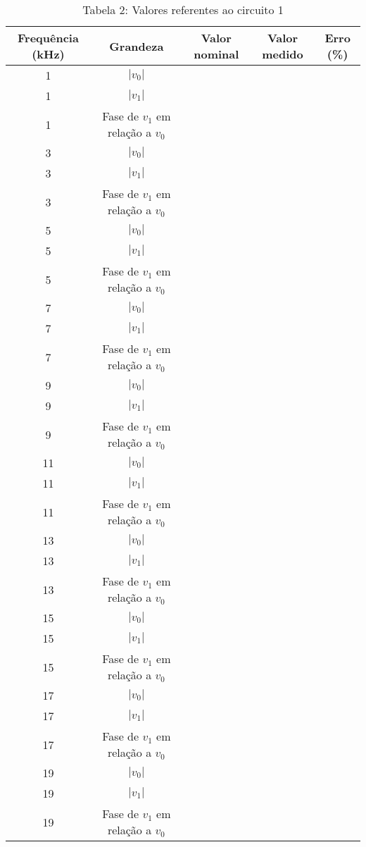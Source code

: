 \vspace{5pt}
\begin{table}[h]
\centering
\begin{tabular}{|c|c|c|c|c|}
\hline
\textbf{Frequência (kHz)} & \textbf{Grandeza} & \textbf{Valor nominal} & \textbf{Valor medido} & 
\textbf{Erro (\%) }\\\hline
1  & $|v_0|$ &  &  &  \\\hline
1  & $|v_1|$ &  &  &  \\\hline
1  & Fase de $v_1$ em relação a $v_0$ &  &  &  \\\hline
3  & $|v_0|$ &  &  &  \\\hline
3  & $|v_1|$ &  &  &  \\\hline
3  & Fase de $v_1$ em relação a $v_0$ &  &  &  \\\hline
5  & $|v_0|$ &  &  &  \\\hline
5  & $|v_1|$ &  &  &  \\\hline
5  & Fase de $v_1$ em relação a $v_0$ &  &  &  \\\hline
7  & $|v_0|$ &  &  &  \\\hline
7  & $|v_1|$ &  &  &  \\\hline
7  & Fase de $v_1$ em relação a $v_0$ &  &  &  \\\hline
9  & $|v_0|$ &  &  &  \\\hline
9  & $|v_1|$ &  &  &  \\\hline
9  & Fase de $v_1$ em relação a $v_0$ &  &  &  \\\hline
11 & $|v_0|$ &  &  &  \\\hline
11 & $|v_1|$ &  &  &  \\\hline
11 & Fase de $v_1$ em relação a $v_0$ &  &  &  \\\hline
13 & $|v_0|$ &  &  &  \\\hline
13 & $|v_1|$ &  &  &  \\\hline
13 & Fase de $v_1$ em relação a $v_0$ &  &  &  \\\hline
15 & $|v_0|$ &  &  &  \\\hline
15 & $|v_1|$ &  &  &  \\\hline
15 & Fase de $v_1$ em relação a $v_0$ &  &  &  \\\hline
17 & $|v_0|$ &  &  &  \\\hline
17 & $|v_1|$ &  &  &  \\\hline
17 & Fase de $v_1$ em relação a $v_0$ &  &  &  \\\hline
19 & $|v_0|$ &  &  &  \\\hline
19 & $|v_1|$ &  &  &  \\\hline
19 & Fase de $v_1$ em relação a $v_0$ &  &  &  \\\hline
\end{tabular}
\caption*{Tabela 2: Valores referentes ao circuito 1}
\end{table}